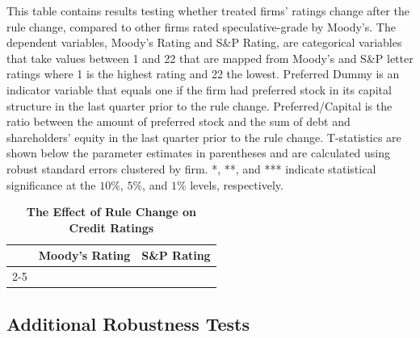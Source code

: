 \documentclass[a4paper, 12pt]{article}
\begin{document}
\begin{landscape}
\pagestyle{empty}

\begin{table}[htbp]
\caption{\textbf{The Effect of Rule Change on Credit Ratings}} \label{table_cr_all}
\begin{singlespace}
\begin{small}

\noindent   This table contains results testing whether treated firms' ratings change after the rule change, compared to other firms rated speculative-grade by Moody's. The dependent variables, Moody's Rating and S\&P Rating, are categorical variables that take values between 1 and 22 that are mapped from Moody's and S\&P letter ratings where 1 is the highest rating and 22 the lowest. Preferred Dummy is an indicator variable that equals one if the firm had preferred stock in its capital structure in the last quarter prior to the rule change. Preferred/Capital is the ratio between the amount of preferred stock and the sum of debt and shareholders' equity in the last quarter prior to the rule change.  T-statistics are shown below the parameter estimates in parentheses and are calculated using robust standard errors clustered by firm. *, **, and *** indicate statistical significance at the $10\%$, $5\%$, and $1\%$ levels, respectively.
\end{small}
\end{singlespace}
\vspace{3mm}

\small
  \centering
    \begin{tabular}{lcccc}
    \toprule
    \textbf{ } &
      \multicolumn{2}{c}{\textbf{Moody's Rating}} &  \multicolumn{2}{c}{\textbf{S\&P Rating}}
      \\
           \cline{2-5}





    \bottomrule
    \end{tabular}
\end{table}
\end{landscape}

\clearpage
\newpage


\subsection*{Additional Robustness Tests}
\end{document}
